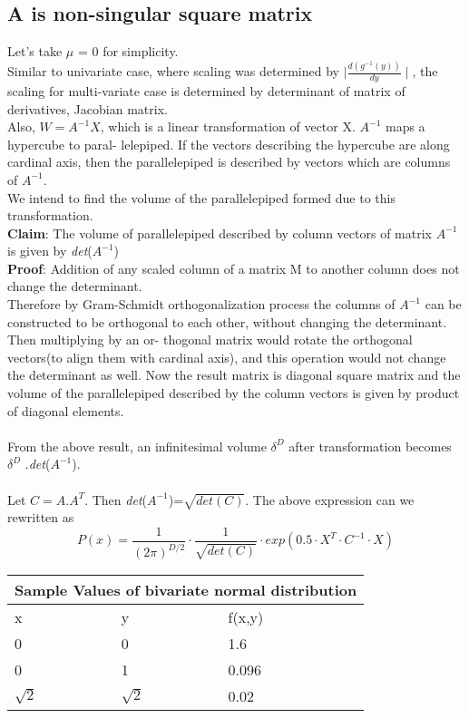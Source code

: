 \documentclass{article}
\begin{document}
\subsection{A is non-singular square matrix}
Let’s take $\mu$ = 0 for simplicity.\\
Similar to univariate case, where scaling was determined by $\mid \frac{d(g^{-1}(y))}{dy}\mid$, the scaling for multi-variate
case is determined by determinant of matrix of derivatives, Jacobian matrix.\\
Also, $W = A^{-1} X$, which is a linear transformation of vector X. $A^{-1}$ maps a hypercube to paral-
lelepiped. If the vectors describing the hypercube are along cardinal axis, then the parallelepiped
is described by vectors which are columns of $A^{-1}$.\\
We intend to find the volume of the parallelepiped formed due to this transformation.\\
\textbf{Claim}: The volume of parallelepiped described by column vectors of matrix $A^{-1}$ is given by
\textit{det}($A^{-1}$)\\
\textbf{Proof}: Addition of any scaled column of a matrix M to another column does not change the
determinant.\\
Therefore by Gram-Schmidt orthogonalization process the columns of $A^{-1}$ can be constructed
to be orthogonal to each other, without changing the determinant. Then multiplying by an or-
thogonal matrix would rotate the orthogonal vectors(to align them with cardinal axis), and this
operation would not change the determinant as well. Now the result matrix is diagonal square
matrix and the volume of the parallelepiped described by the column vectors is given by product
of diagonal elements.\\ \\
From the above result, an infinitesimal volume $\delta^D$ after transformation becomes $\delta^D$ .\textit{det}($A^{-1}$).\\ \\
Let $C=A.A^T$. Then \textit{det}($A^{-1}$)=$\sqrt{\textit{det}(C)}$. The above expression can we rewritten as
\begin{equation}
P(x)=\frac{1}{(2\pi)^{D/2}}\cdot\frac{1}{\sqrt{\textit{det}(C)}}\cdot exp({0.5}\cdot X^T \cdot C^{-1} \cdot X)
\end{equation}

\begin{tabular}{ |p{3cm}|p{3cm}||p{3cm}| }
\hline
\multicolumn{3}{|c|}{Sample Values of bivariate normal distribution}\\
\hline
x & y & f(x,y)\\
\hline
0 & 0 & 1.6 \\
0 & 1 & 0.096\\
$\sqrt{2}$ & $\sqrt{2}$ & 0.02 \\
\hline
\end{tabular}\\

\printbibliography
\end{document}
